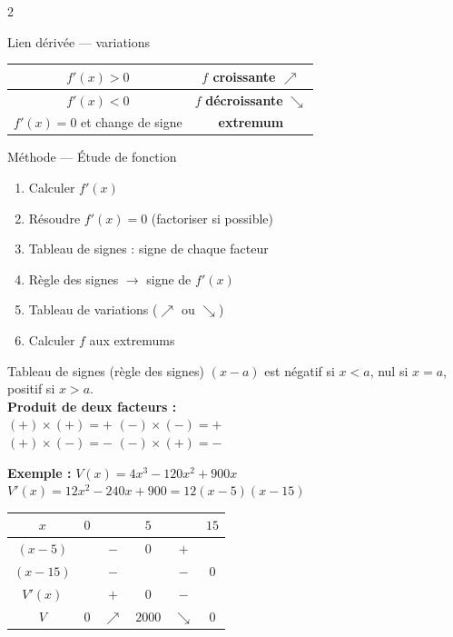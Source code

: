 \documentclass[a4paper,10pt]{article}
\begin{document}
\begin{multicols}{2}
\begin{defbox}{Lien dérivée — variations}
\begin{center}
\renewcommand{\arraystretch}{1.3}
\begin{tabular}{|c|c|}
\hline
$f'(x) > 0$ & $f$ \textbf{croissante} $\nearrow$ \\
\hline
$f'(x) < 0$ & $f$ \textbf{décroissante} $\searrow$ \\
\hline
$f'(x) = 0$ et change de signe & \textbf{extremum} \\
\hline
\end{tabular}
\end{center}
\end{defbox}

\begin{methbox}{Méthode — Étude de fonction}
\begin{enumerate}[nosep,leftmargin=12pt]
  \item Calculer $f'(x)$
  \item Résoudre $f'(x) = 0$ (factoriser si possible)
  \item Tableau de signes : signe de chaque facteur
  \item Règle des signes $\to$ signe de $f'(x)$
  \item Tableau de variations ($\nearrow$ ou $\searrow$)
  \item Calculer $f$ aux extremums
\end{enumerate}
\end{methbox}

\begin{methbox}{Tableau de signes (règle des signes)}
$(x - a)$ est négatif si $x < a$, nul si $x = a$, positif si $x > a$.\\[4pt]
\textbf{Produit de deux facteurs :}\\
$(+) \times (+) = +$ \quad $(-) \times (-) = +$\\
$(+) \times (-) = -$ \quad $(-) \times (+) = -$
\end{methbox}

\begin{exbox}
\textbf{Exemple :} $V(x) = 4x^3 - 120x^2 + 900x$\\
$V'(x) = 12x^2 - 240x + 900 = 12(x-5)(x-15)$\\[4pt]
\renewcommand{\arraystretch}{1.3}
\begin{tabular}{|c|c|c|c|c|c|}
\hline
$x$ & $0$ & & $5$ & & $15$ \\
\hline
$(x-5)$ & & $-$ & $0$ & $+$ & \\
\hline
$(x-15)$ & & $-$ & & $-$ & $0$ \\
\hline
$V'(x)$ & & $+$ & $0$ & $-$ & \\
\hline
$V$ & $0$ & $\nearrow$ & $2000$ & $\searrow$ & $0$ \\
\hline
\end{tabular}
\end{exbox}


\end{multicols}
\end{document}
